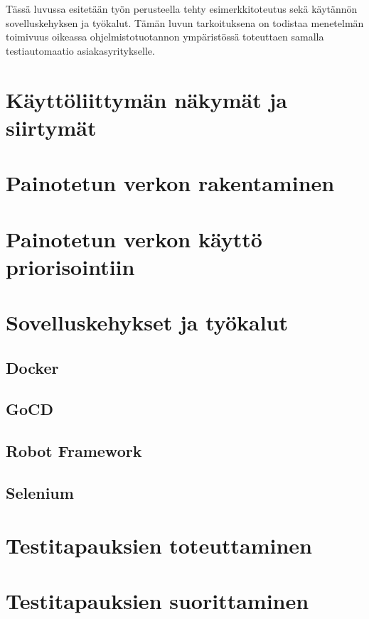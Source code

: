 Tässä luvussa esitetään työn perusteella tehty esimerkkitoteutus sekä käytännön sovelluskehyksen ja työkalut.
Tämän luvun tarkoituksena on todistaa menetelmän toimivuus oikeassa ohjelmistotuotannon ympäristössä toteuttaen samalla testiautomaatio asiakasyritykselle.

\section{Käyttöliittymän näkymät ja siirtymät} \label{11_kayttoliittyman_nakymat_ja_siirtymat}


\section{Painotetun verkon rakentaminen} \label{11_painotetun_verkon_rakentaminen}


\section{Painotetun verkon käyttö priorisointiin} \label{11_painotetun_verkon_kaytto_priorisointiin}


\section{Sovelluskehykset ja työkalut} \label{11_sovelluskehykset_ja_tyokalut}


  \subsection{Docker} \label{11_docker}


  \subsection{GoCD} \label{11_gocd}


  \subsection{Robot Framework} \label{11_robot_framework}


  \subsection{Selenium} \label{11_selenium}


\section{Testitapauksien toteuttaminen} \label{11_testitapauksien_toteuttaminen}


\section{Testitapauksien suorittaminen} \label{11_testitapauksien_suorittaminen}

